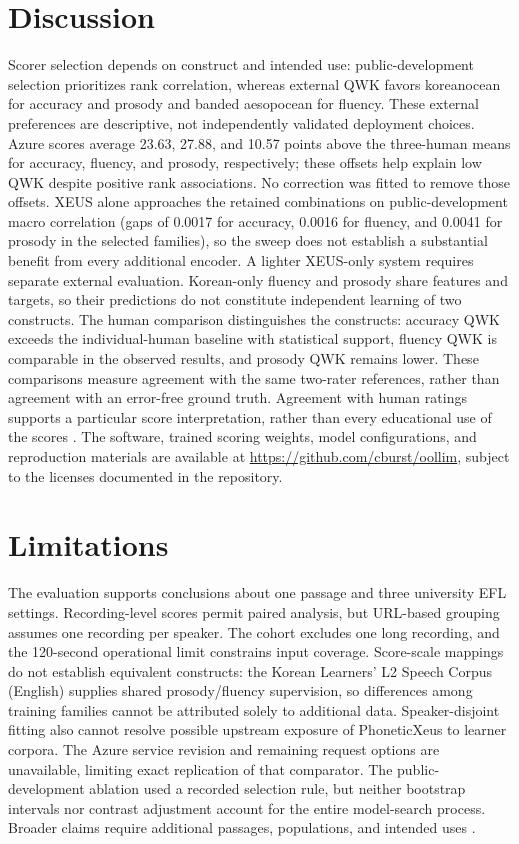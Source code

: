 \documentclass[cameraready]{Interspeech}
\begin{document}
\section{Discussion}
Scorer selection depends on construct and intended use: public-development selection prioritizes rank correlation, whereas external QWK favors koreanocean for accuracy and prosody and banded aesopocean for fluency. These external preferences are descriptive, not independently validated deployment choices. Azure scores average 23.63, 27.88, and 10.57 points above the three-human means for accuracy, fluency, and prosody, respectively; these offsets help explain low QWK despite positive rank associations. No correction was fitted to remove those offsets. XEUS alone approaches the retained combinations on public-development macro correlation (gaps of 0.0017 for accuracy, 0.0016 for fluency, and 0.0041 for prosody in the selected families), so the sweep does not establish a substantial benefit from every additional encoder. A lighter XEUS-only system requires separate external evaluation. Korean-only fluency and prosody share features and targets, so their predictions do not constitute independent learning of two constructs. The human comparison distinguishes the constructs: accuracy QWK exceeds the individual-human baseline with statistical support, fluency QWK is comparable in the observed results, and prosody QWK remains lower. These comparisons measure agreement with the same two-rater references, rather than agreement with an error-free ground truth. Agreement with human ratings supports a particular score interpretation, rather than every educational use of the scores \cite{kane}. The software, trained scoring weights, model configurations, and reproduction materials are available at \url{https://github.com/cburst/oollim}, subject to the licenses documented in the repository.

\section{Limitations}
The evaluation supports conclusions about one passage and three university EFL settings. Recording-level scores permit paired analysis, but URL-based grouping assumes one recording per speaker. The cohort excludes one long recording, and the 120-second operational limit constrains input coverage. Score-scale mappings do not establish equivalent constructs: the Korean Learners' L2 Speech Corpus (English) supplies shared prosody/fluency supervision, so differences among training families cannot be attributed solely to additional data. Speaker-disjoint fitting also cannot resolve possible upstream exposure of PhoneticXeus to learner corpora. The Azure service revision and remaining request options are unavailable, limiting exact replication of that comparator. The public-development ablation used a recorded selection rule, but neither bootstrap intervals nor contrast adjustment account for the entire model-search process. Broader claims require additional passages, populations, and intended uses \cite{kane}.
\end{document}
